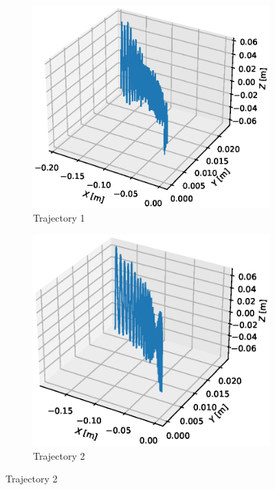 \begin{figure}[H]
\begin{subfigure}{.5\textwidth}
\centering
\includegraphics[width=\linewidth]{Images/trajectory_sin.eps}
\caption{Trajectory 1}
\end{subfigure}
\hfill
\begin{subfigure}{.5\textwidth}
\centering
\includegraphics[width=\linewidth]{Images/trajectory_sin copy.eps}
\caption{Trajectory 2}

\end{subfigure}
\end{figure}
